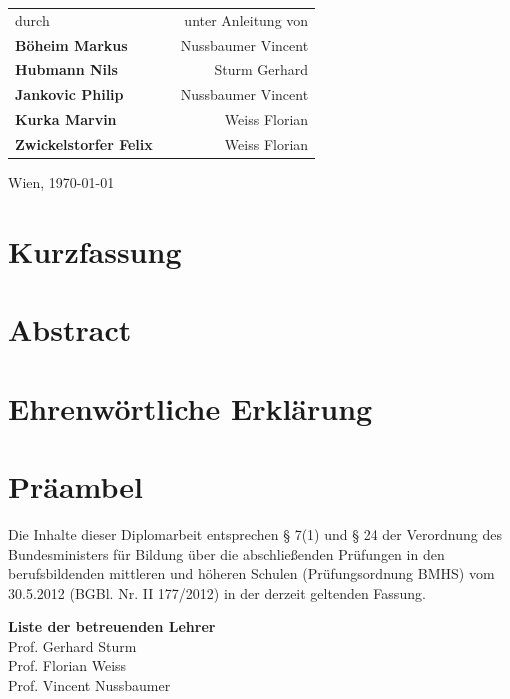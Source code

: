 \documentclass[
    headings=optiontotocandhead,%
    twoside,
    numbers=noenddot,%
    toc=flat, %
    12pt, %
    titlepage, %
    parskip=full, %
    listof=totoc, %
    listof=flat, %
    numbers=noenddot, %
    bibliography=totoc, %
    a4paper,DIV=14,
    BCOR=15mm,
]{scrbook}
\begin{document}
\begin{titlepage}
\begin{center}
{
\renewcommand{\arraystretch}{1.8}
\begin{tabular}{l c r}
durch  & \hfill & unter Anleitung von \\
\textbf{\large{}Böheim Markus} && Nussbaumer Vincent \\
\textbf{\large{}Hubmann Nils} && Sturm Gerhard \\
\textbf{\large{}Jankovic Philip} && Nussbaumer Vincent \\
\textbf{\large{}Kurka Marvin} && Weiss Florian \\
\textbf{\large{}Zwickelstorfer Felix} && Weiss Florian \\
\end{tabular}
}

\vfill

Wien, \today
\par\end{center}

\end{titlepage}

\chapter*{Kurzfassung}


\chapter*{Abstract}


\chapter*{Ehrenwörtliche Erklärung}


\chapter*{Präambel}
Die Inhalte dieser Diplomarbeit entsprechen § 7(1) und § 24 der Verordnung des Bundesministers für Bildung über die abschließenden Prüfungen in den berufsbildenden mittleren und höheren Schulen (Prüfungsordnung BMHS) vom 30.5.2012 (BGBl. Nr. II 177/2012) in der derzeit geltenden Fassung.

\textbf{Liste der betreuenden Lehrer} \\
Prof. Gerhard Sturm \\ %
Prof. Florian Weiss \\
Prof. Vincent Nussbaumer \\
\end{document}
